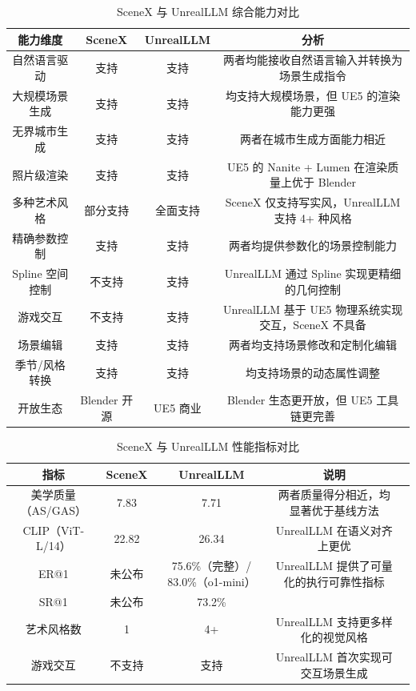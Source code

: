 \documentclass[a4paper]{article}
\begin{document}
\begin{table}[!htbp]
  \centering
  \begin{tabular}{cccc}
  \toprule
  \textbf{能力维度} & \textbf{SceneX} & \textbf{UnrealLLM} & \textbf{分析} \\
  \midrule
  自然语言驱动 & 支持 & 支持 & 两者均能接收自然语言输入并转换为场景生成指令 \\
  大规模场景生成 & 支持 & 支持 & 均支持大规模场景，但 UE5 的渲染能力更强 \\
  无界城市生成 & 支持 & 支持 & 两者在城市生成方面能力相近 \\
  照片级渲染 & 支持 & 支持 & UE5 的 Nanite + Lumen 在渲染质量上优于 Blender \\
  多种艺术风格 & 部分支持 & 全面支持 & SceneX 仅支持写实风，UnrealLLM 支持 4+ 种风格 \\
  精确参数控制 & 支持 & 支持 & 两者均提供参数化的场景控制能力 \\
  Spline 空间控制 & 不支持 & 支持 & UnrealLLM 通过 Spline 实现更精细的几何控制 \\
  游戏交互 & 不支持 & 支持 & UnrealLLM 基于 UE5 物理系统实现交互，SceneX 不具备 \\
  场景编辑 & 支持 & 支持 & 两者均支持场景修改和定制化编辑 \\
  季节/风格转换 & 支持 & 支持 & 均支持场景的动态属性调整 \\
  开放生态 & Blender 开源 & UE5 商业 & Blender 生态更开放，但 UE5 工具链更完善 \\
  \bottomrule
  \end{tabular}
  \caption{SceneX 与 UnrealLLM 综合能力对比}
  \label{tab:capability}
\end{table}

\begin{table}[!htbp]
  \centering
  \begin{tabular}{ccccc}
  \toprule
  \textbf{指标} & \textbf{SceneX} & \textbf{UnrealLLM} & \textbf{说明} \\
  \midrule
  美学质量（AS/GAS） & 7.83 & 7.71 & 两者质量得分相近，均显著优于基线方法 \\
  CLIP（ViT-L/14） & 22.82 & 26.34 & UnrealLLM 在语义对齐上更优 \\
  ER@1 & 未公布 & 75.6\%（完整）/ 83.0\%（o1-mini） & UnrealLLM 提供了可量化的执行可靠性指标 \\
  SR@1 & 未公布 & 73.2\% & \\
  艺术风格数 & 1 & 4+ & UnrealLLM 支持更多样化的视觉风格 \\
  游戏交互 & 不支持 & 支持 & UnrealLLM 首次实现可交互场景生成 \\
  \bottomrule
  \end{tabular}
  \caption{SceneX 与 UnrealLLM 性能指标对比}
  \label{tab:metrics}
\end{table}
\end{document}
